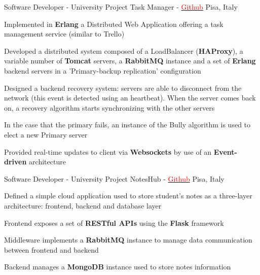 \begin{cventries}
  \cventry
    {Software Developer - University Project} %
    {Task Manager - \href{https://github.com/FilippoGuggino/TaskManagerProject}{\textcolor{red}{Github}}} %
    {Pisa, Italy} %
    {} %
    {
      \begin{cvitems} %
        \item {Implemented in \textbf{Erlang} a Distributed Web Application offering a task management service (similar to Trello)}
        \item {Developed a distributed system composed of a LoadBalancer (\textbf{HAProxy}), a variable number of \textbf{Tomcat} servers, a \textbf{RabbitMQ} instance and a set of \textbf{Erlang} backend servers in a 'Primary-backup replication' configuration}
        \item {Designed a backend recovery system: servers are able to disconnect from the network (this event is detected using an heartbeat). When the server comes back on, a recovery algorithm starts synchronizing with the other servers}
        \item {In the case that the primary fails, an instance of the Bully algorithm is used to elect a new Primary server}
        \item {Provided real-time updates to client via \textbf{Websockets} by use of an \textbf{Event-driven} architecture}
      \end{cvitems}
    }

  \cventry
    {Software Developer - University Project} %
    {NotesHub - \href{https://github.com/FilippoGuggino/NotesHub-CloudComputing}{\textcolor{red}{Github}}} %
    {Pisa, Italy} %
    {} %
    {
      \begin{cvitems} %
        \item {Defined a simple cloud application used to store student's notes as a three-layer architecture: frontend, backend and database layer}
        \item {Frontend exposes a set of \textbf{RESTful APIs} using the \textbf{Flask} framework}
        \item {Middleware implements a \textbf{RabbitMQ} instance to manage data communication between frontend and backend}
        \item {Backend manages a \textbf{MongoDB} instance used to store notes information}
      \end{cvitems}
    }


\end{cventries}
